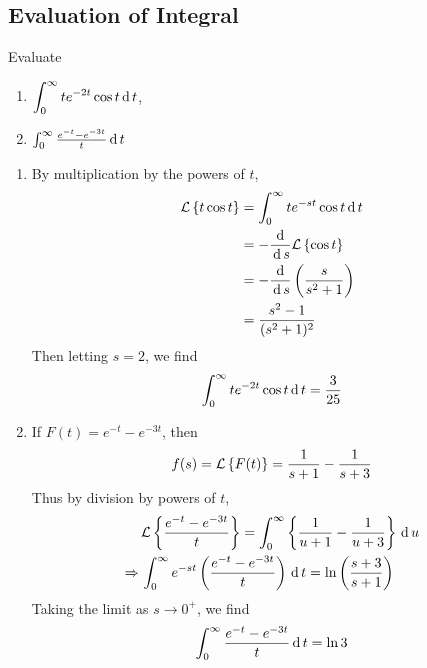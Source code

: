 \documentclass[../main-sheet.tex]{subfiles}
\begin{document}
\subsection{Evaluation of Integral}
\begin{prob}
    Evaluate \begin{enumerate}[label=(\alph*)]
        \item $ \displaystyle \int_0^\infty t e^{-2t}\cos t \,\mathrm{d}\, t$,
        \item $ \int_0^\infty \frac{e^{-t}-e^{-3t}}{t}\,\mathrm{d}\, t $
    \end{enumerate}
\end{prob}
\begin{soln}
    \begin{enumerate}[label=(\alph*)]
        \item By multiplication by the powers of $ t $,
        \begin{align*}
            \mathcal{L}\left\{ t\cos t\right\}&=\int_0^\infty t e^{-st}\cos t \,\mathrm{d}\, t\\
            &=-\frac{\,\mathrm{d}\,}{\,\mathrm{d}\, s}\mathcal{L}\left\{ \cos t\right\}\\
            &=-\frac{\,\mathrm{d}\,}{\,\mathrm{d}\, s}\left( \frac{s}{s^2+1} \right)\\
            &=\frac{s^2-1}{(s^2+1)^2}
        \end{align*}
        Then letting $ s=2 $, we find
        \[
            \int_0^\infty te^{-2t}\cos t\,\mathrm{d}\, t=\frac{3}{25}
        \]
        \item If $ F(t)= e^{-t}-e^{-3t}$, then 
        \[
            f(s)=\mathcal{L}\left\{ F(t)\right\}=\frac{1}{s+1}-\frac{1}{s+3}
        \]
        Thus by division by powers of $ t $,
        \begin{align*}
            & \mathcal{L}\left\{ \frac{e^{-t}-e^{-3t}}{t}\right\}=\int_0^\infty \left\{ \frac{1}{u+1}-\frac{1}{u+3} \right\}\,\mathrm{d}\, u\\
            \Rightarrow\,& \int_0^\infty e^{-st}\left(\frac{e^{-t}-e^{-3t}}{t}\right)\,\mathrm{d}\, t=\ln\left( \frac{s+3}{s+1} \right)
        \end{align*}
        Taking the limit as $ s\to 0^+ $, we find
        \[
            \int_0^\infty \frac{e^{-t}-e^{-3t}}{t}\,\mathrm{d}\, t=\ln 3
        \]
    \end{enumerate}
\end{soln}
\end{document}
